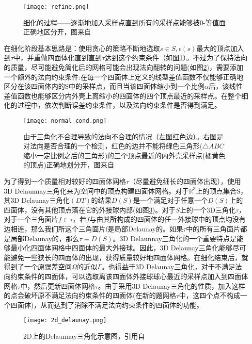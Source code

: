 \begin{figure}[htbp]
    \centering
    \texttt{[image: refine.png]}
    \caption[细化过程]{细化的过程——逐渐地加入采样点直到所有的采样点能够被0-等值面正确地区分开，图来自\cite{isotopic-appro}}
    \label{fig:refine}
\end{figure}

\par 在细化阶段基本思路是：使用贪心的策略不断地选取$s \in S,\epsilon(s)$最大的顶点加入到$\tau$中，并重做四面体化直到直到$\tau$达到这个约束条件（如图\ref{fig:refine}）。不过为了保持法向的质量，尽可能避免简化后的网格可能会出现法向翻转的问题(如图\ref{fig:normal-cond})，需要添加一个额外的法向约束条件:在每一个四面体上定义的线型差值函数不仅能够正确地区分在该四面体内的S中的采样点，而且当该四面体缩小到一个比例$\alpha$后，该线性差值函数也能够区分内外壳上离缩小的四面体的四个顶点最近的采样点。在整个细化的过程中，依次判断误差约束条件，以及法向约束条件是否得到满足。
\begin{figure}[htbp]
    \centering
    \texttt{[image: normal\_cond.png]}
    \caption[法向约束条件]{由于三角化不合理导致的法向不合理的情况（左图红色边）。右图是对法向是否合理的一个检测，红色的边并不能将绿色三角形($\triangle ABC$缩小一定比例之后的三角形)的三个顶点最近的内外壳采样点(橘黄色的顶点)正确地划分开，图来自\cite{isotopic-appro}}
    \label{fig:normal-cond}
\end{figure}
为了得到一个质量相对较好的四面体网格$\tau$（尽量避免细长的四面体出现），使用3D Delaunnay三角化来为空间中的顶点构建四面体网格。对于$\mathbb{R}^3$上的顶点集合S，其3D Delaunay三角化$(DT)$的结果$D(S)$是一个满足对于任意一个$D(S)$上的四面体，没有其他顶点落在它的外接球内部(如图\ref{fig:2d-delaunay})。对于$S$上的一个3D三角化$\tau$，对于一个三角面片$f \in \tau$，若$f$与由其所构成的四面体的任一外接球中的顶点均没有边相连，那么我们所这个三角面片f是局部Delaunay的。如果$\tau$中的所有三角面片都是局部Delaunay的，那么$\tau \equiv D(S)$。3D Delaunnay三角化的一个重要特点是能够最小化四面体网格中四面体的最大外接球。因此，3D Delaunay三角化能够尽可能避免一些狭长的四面体的出现，获得质量较好地四面体网格。在细化结束后，就得到了一个原误差空间$\Omega$的近似$\Gamma$。也得益于3D Delaunay三角化，对于不满足法向约束条件的四面体，可以选取离该四面体外接球球心最近的采样点加入到四面体网格$\tau$中，然后更新四面体网格$\tau$。由于采用3D Delaunay三角化的性质，加入这样的点会破坏原不满足法向约束条件的四面体(在新的题网格$\tau$中，这四个点不构成一个四面体)，从而达到了消除不满足法向约束条件的四面体的功能。
\begin{figure}[htbp]
    \centering
    \texttt{[image: 2d\_delaunay.png]}
    \caption[2D Delaunay]{2D上的Delaunnay三角化示意图，引用自\cite{delaunay-wiki}}
    \label{fig:2d-delaunay}
\end{figure}


